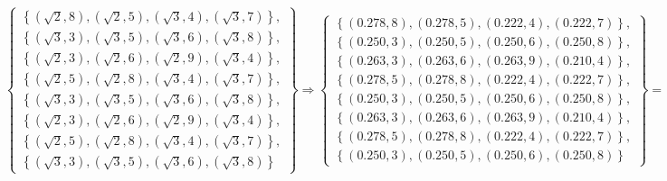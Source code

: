 \documentclass{article}[10pt]
\begin{document}
\begin{equation}
\left\{\begin{array}{c} 
\left\{\left(\sqrt{2},8\right),\left(\sqrt{2},5\right),\left(\sqrt{3},4\right),\left(\sqrt{3},7\right)\right\},\\
\left\{\left(\sqrt{3},3\right),\left(\sqrt{3},5\right),\left(\sqrt{3},6\right),\left(\sqrt{3},8\right)\right\},\\
\left\{\left(\sqrt{2},3\right),\left(\sqrt{2},6\right),\left(\sqrt{2},9\right),\left(\sqrt{3},4\right)\right\},\\
\left\{\left(\sqrt{2},5\right),\left(\sqrt{2},8\right),\left(\sqrt{3},4\right),\left(\sqrt{3},7\right)\right\},\\
\left\{\left(\sqrt{3},3\right),\left(\sqrt{3},5\right),\left(\sqrt{3},6\right),\left(\sqrt{3},8\right)\right\},\\
\left\{\left(\sqrt{2},3\right),\left(\sqrt{2},6\right),\left(\sqrt{2},9\right),\left(\sqrt{3},4\right)\right\},\\
\left\{\left(\sqrt{2},5\right),\left(\sqrt{2},8\right),\left(\sqrt{3},4\right),\left(\sqrt{3},7\right)\right\},\\
\left\{\left(\sqrt{3},3\right),\left(\sqrt{3},5\right),\left(\sqrt{3},6\right),\left(\sqrt{3},8\right)\right\}
\end{array}\right\} \Longrightarrow
\left\{\begin{array}{c} 
\left\{\left(0.278,8\right),\left(0.278,5\right),\left(0.222,4\right),\left(0.222,7\right)\right\},\\
\left\{\left(0.250,3\right),\left(0.250,5\right),\left(0.250,6\right),\left(0.250,8\right)\right\},\\
\left\{\left(0.263,3\right),\left(0.263,6\right),\left(0.263,9\right),\left(0.210,4\right)\right\},\\
\left\{\left(0.278,5\right),\left(0.278,8\right),\left(0.222,4\right),\left(0.222,7\right)\right\},\\
\left\{\left(0.250,3\right),\left(0.250,5\right),\left(0.250,6\right),\left(0.250,8\right)\right\},\\
\left\{\left(0.263,3\right),\left(0.263,6\right),\left(0.263,9\right),\left(0.210,4\right)\right\},\\
\left\{\left(0.278,5\right),\left(0.278,8\right),\left(0.222,4\right),\left(0.222,7\right)\right\},\\
\left\{\left(0.250,3\right),\left(0.250,5\right),\left(0.250,6\right),\left(0.250,8\right)\right\}
\end{array}\right\} = \left\{w_{t}^X\right\}_o
\end{equation}
\end{document}
